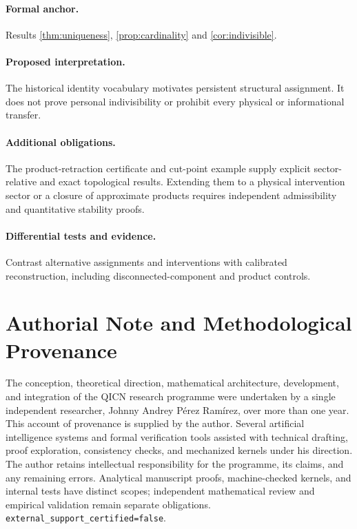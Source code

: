 \documentclass[11pt,a4paper]{article}
\theoremstyle{plain}
\theoremstyle{definition}
\theoremstyle{remark}
\begin{document}
\paragraph{Formal anchor.} Results \ref{thm:uniqueness}, \ref{prop:cardinality} and \ref{cor:indivisible}.

\paragraph{Proposed interpretation.} The historical identity vocabulary motivates persistent structural assignment. It does not prove personal indivisibility or prohibit every physical or informational transfer.

\paragraph{Additional obligations.} The product-retraction certificate and cut-point example supply explicit sector-relative and exact topological results. Extending them to a physical intervention sector or a closure of approximate products requires independent admissibility and quantitative stability proofs.

\paragraph{Differential tests and evidence.} Contrast alternative assignments and interventions with calibrated reconstruction, including disconnected-component and product controls.



\printbibliography
\section*{Authorial Note and Methodological Provenance}
The conception, theoretical direction, mathematical architecture, development,
and integration of the QICN research programme were undertaken by a single
independent researcher, Johnny Andrey P\'erez Ram\'irez, over more than one year.
This account of provenance is supplied by the author. Several artificial
intelligence systems and formal verification tools assisted with technical
drafting, proof exploration, consistency checks, and mechanized kernels under
his direction. The author retains intellectual responsibility for the
programme, its claims, and any remaining errors. Analytical manuscript proofs,
machine-checked kernels, and internal tests have distinct scopes; independent
mathematical review and empirical validation remain separate obligations.
\texttt{external\_support\_certified=false}.
\end{document}
